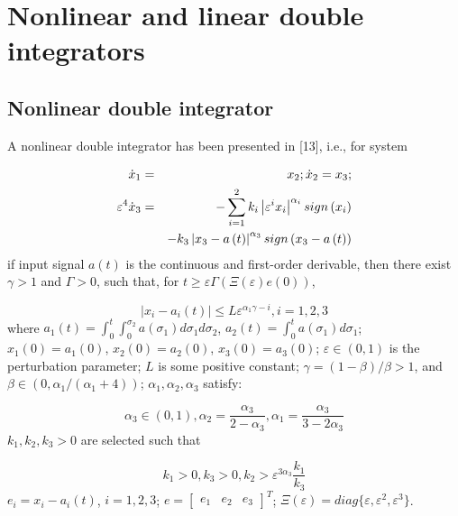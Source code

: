 \documentclass[10pt,journal]{IEEEtran}
\begin{document}
\section{Nonlinear and linear double integrators}

\subsection{Nonlinear double integrator}

A nonlinear double integrator has been presented in [13], i.e., for system

\begin{eqnarray}
\dot{x}_{1} &=&x_{2};\dot{x}_{2}=x_{3};  \notag \\
\varepsilon ^{4}\dot{x}_{3} &=&-\sum\limits_{{i=1}}^{{2}}k_{i}\left\vert
\varepsilon ^{i}x_{i}\right\vert ^{\alpha _{i}}sign\left( x_{i}\right)
\notag \\
&&-k_{3}\left\vert x_{3}-a\left( t\right) \right\vert ^{\alpha
_{3}}sign\left( x_{3}-a\left( t\right) \right)
\end{eqnarray}if input signal $a\left( t\right) $ is the continuous and first-order
derivable, then there exist $\gamma >1$ and $\Gamma >0$, such that, for $t\geq \varepsilon \Gamma \left( \Xi (\varepsilon )e\left( {0}\right) \right)
$,

\begin{equation}
\left\vert x_{i}-a_{i}\left( t\right) \right\vert \leq L\varepsilon ^{\alpha
_{1}\gamma -i},i=1,2,3
\end{equation}where $a_{1}\left( t\right) =\int_{0}^{t}\int_{0}^{\sigma _{2}}a\left(
\sigma _{1}\right) d\sigma _{1}d\sigma _{2}$, $a_{2}\left( t\right)
=\int_{0}^{t}a\left( \sigma _{1}\right) d\sigma _{1}$; $x_{1}\left( 0\right)
=a_{1}\left( 0\right) $, $x_{2}\left( 0\right) =a_{2}\left( 0\right) $, $x_{3}\left( 0\right) =a_{3}\left( 0\right) $; $\varepsilon \in \left(
0,1\right) $ is the perturbation parameter; $L$ is some positive constant; $\gamma =(1-\beta )/\beta >1$, and $\beta \in \left( 0,\alpha _{1}/(\alpha
_{1}+4)\right) $; $\alpha _{1},\alpha _{2},\alpha _{3}$ satisfy:

\begin{equation}
\alpha _{3}\in (0,1),\alpha _{2}=\frac{\alpha _{3}}{2-\alpha _{3}},\alpha
_{1}=\frac{\alpha _{3}}{3-2\alpha _{3}}
\end{equation}$k_{1},k_{2},k_{3}>0$ are selected such that

\begin{equation}
k_{1}>0,k_{3}>0,k_{2}>\varepsilon ^{3\alpha _{3}}\frac{k_{1}}{k_{3}}
\end{equation}$e_{i}=x_{i}-a_{i}\left( t\right) $, $i=1,2,3$; $e=[\begin{array}{ccc}
e_{1} & e_{2} & e_{3}\end{array}]^{{T}}$; $\Xi (\varepsilon )=diag\{\varepsilon ,\varepsilon
^{2},\varepsilon ^{3}\}$.
\end{document}

